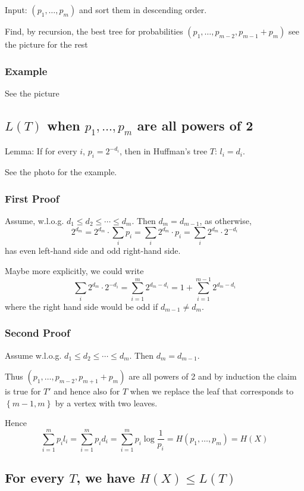 \documentclass{article}
\begin{document}
Input: $(p_1,\ldots, p_m)$ and sort them in descending order.

Find, by recursion, the best tree for probabilities $\left(p_1,\ldots, p_{m-2},p_{m-1}+p_m\right)$ see the picture for the rest

\subsubsection{Example}

See the picture 

\subsection{$L(T)$ when $p_1,\ldots,p_m$ are all powers of 2}

Lemma: If for every $i$, $p_i=2^{-d_i}$, then in Huffman's tree $T$: $l_i=d_i$.

See the photo for the example.

\subsubsection{First Proof}

Assume, w.l.o.g. $d_1\leq d_2\leq \cdots \leq d_m$. Then $d_m=d_{m-1}$, as otherwise,
\[
2^{d_m} = 2^{d_m}\cdot \sum_i p_i = \sum_i 2^{d_m}\cdot p_i = \sum_i 2^{d_m}\cdot 2^{-d_i}
\]
has even left-hand side and odd right-hand side.

Maybe more explicitly, we could write 
\[
\sum_i 2^{d_m}\cdot 2^{-d_i} = \sum^m_{i=1} 2^{d_m-d_i}= 1+ \sum^{m-1}_{i=1} 2^{d_m-d_i}
\]
where the right hand side would be odd if $d_{m-1}\neq d_m$.

\subsubsection{Second Proof}

Assume w.l.o.g. $d_1\leq d_2\leq \cdots \leq d_m$. Then $d_m=d_{m-1}$.

Thus $\left(p_1,\ldots,p_{m-2},p_{m+1}+p_m\right)$ are all powers of 2 and by induction the claim is true for $T'$ and hence also for $T$ when we replace the leaf that corresponds to $\left\{m-1,m\right\}$ by a vertex with two leaves.

Hence 
\[
\sum_{i=1 }^{m }p_i l_i = \sum_{i=1 }^{m }p_i d_i = \sum_{i=1 }^{m }p_i \log \frac{1 }{p_i }= H\left(p_1, \ldots, p_m \right) = H(X)
\]

\subsection{For every $T$, we have $H(X)\leq L(T)$}
\end{document}

